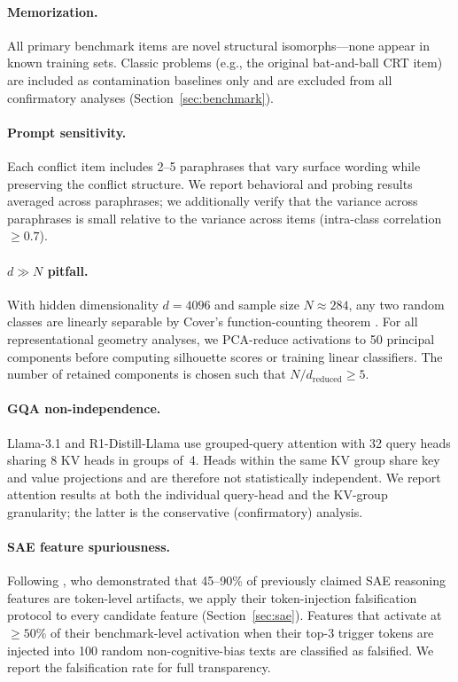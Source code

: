 \paragraph{Memorization.}
All primary benchmark items are novel structural isomorphs---none appear in
known training sets.  Classic problems (e.g., the original bat-and-ball CRT
item) are included as contamination baselines only and are excluded from all
confirmatory analyses (Section~\ref{sec:benchmark}).

\paragraph{Prompt sensitivity.}
Each conflict item includes 2--5 paraphrases that vary surface wording while
preserving the conflict structure.  We report behavioral and probing results
averaged across paraphrases; we additionally verify that the variance across
paraphrases is small relative to the variance across items (intra-class
correlation $\geq 0.7$).

\paragraph{$d \gg N$ pitfall.}
With hidden dimensionality $d = 4096$ and sample size $N \approx 284$, any
two random classes are linearly separable by Cover's function-counting
theorem \citep{cover1965geometrical}.  For all representational geometry
analyses, we PCA-reduce activations to 50 principal components before
computing silhouette scores or training linear classifiers.  The number of
retained components is chosen such that $N / d_{\text{reduced}} \geq 5$.

\paragraph{GQA non-independence.}
Llama-3.1 and R1-Distill-Llama use grouped-query attention with 32 query
heads sharing 8 KV heads in groups of~4.  Heads within the same KV group
share key and value projections and are therefore not statistically
independent.  We report attention results at both the individual query-head
and the KV-group granularity; the latter is the conservative
(confirmatory) analysis.

\paragraph{SAE feature spuriousness.}
Following \citet{ma2026falsification}, who demonstrated that 45--90\% of
previously claimed SAE reasoning features are token-level artifacts, we
apply their token-injection falsification protocol to every candidate
feature (Section~\ref{sec:sae}).  Features that activate at $\geq 50$\%
of their benchmark-level activation when their top-3 trigger tokens are
injected into 100 random non-cognitive-bias texts are classified as
falsified.  We report the falsification rate for full transparency.
